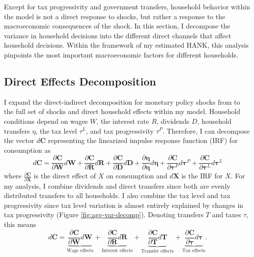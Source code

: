 Except for tax progressivity and government transfers, household behavior within the model is not a direct response to shocks, but rather a response to the macroeconomic consequences of the shock. In this section, I decompose the variance in household decisions into the different direct channels that affect household decisions. Within the framework of my estimated HANK, this analysis pinpoints the most important macroeconomic factors for different households.

\subsection{Direct Effects Decomposition}
I expand the direct-indirect decomposition for monetary policy shocks from \textcite{kaplan2018monetary} to the full set of shocks and direct household effects within my model. Household conditions depend on wages $W$, the interest rate $R$, dividends $D$, household transfers $\eta$, the tax level $\tau^L$, and tax progressivity $\tau^P$. Therefore, I can decompose the vector $d \mathbf{C}$ representing the linearized impulse response function (IRF) for consumption as 
\[
    d \mathbf{C} = \frac{\partial \mathbf{C}}{\partial \mathbf{W}} d \mathbf{W} + \frac{\partial \mathbf{C}}{\partial \mathbf{R}} d \mathbf{R} + \frac{\partial \mathbf{C}}{\partial \mathbf{D}} d \mathbf{D} + \frac{\partial \mathbf{\eta}}{\partial \mathbf{\eta}} d \mathbf{\eta} + \frac{\partial \mathbf{C}}{\partial \mathbf{\tau}^P} d \mathbf{\tau}^P + \frac{\partial \mathbf{C}}{\partial \mathbf{\tau}^L} d \mathbf{\tau}^L
\]
where $\frac{\partial \mathbf{C}}{\partial \mathbf{X}}$ is the direct effect of $X$ on consumption and $d \mathbf{X}$ is the IRF for $X$. For my analysis, I combine dividends and direct transfers since both are evenly distributed transfers to all households. I also combine the tax level and tax progressivity since tax level variation is almost entirely explained by changes in tax progressivity (Figure \ref{fig:agg-var-decomp}). Denoting transfers $T$ and taxes $\tau$, this means
\[
    d \mathbf{C} = \underbrace{\frac{\partial \mathbf{C}}{\partial \mathbf{W}} d \mathbf{W}}_{\text{Wage effects}} + \underbrace{\frac{\partial \mathbf{C}}{\partial \mathbf{R}} d \mathbf{R}}_{\text{Interest effects}} + \underbrace{\frac{\partial \mathbf{C}}{\partial \mathbf{T}} d \mathbf{T}}_{\text{Transfer effects}} + \underbrace{\frac{\partial \mathbf{C}}{\partial \mathbf{\tau}} d \mathbf{\tau}}_{\text{Tax effects}}.
\]

